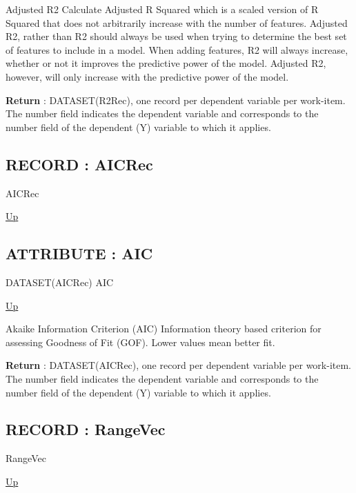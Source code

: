 \par
Adjusted R2 Calculate Adjusted R Squared which is a scaled version of R Squared that does not arbitrarily increase with the number of features. Adjusted R2, rather than R2 should always be used when trying to determine the best set of features to include in a model. When adding features, R2 will always increase, whether or not it improves the predictive power of the model. Adjusted R2, however, will only increase with the predictive power of the model.
\par
\textbf{Return} : DATASET(R2Rec), one record per dependent variable per work-item. The number field indicates the dependent variable and corresponds to the number field of the dependent (Y) variable to which it applies. \\
\subsection*{RECORD : AICRec}
\hypertarget{ecldoc:linearregression.ols.aicrec}{}
\begin{minipage}[t]{\textwidth}
\begin{flushleft}
 AICRec 
\end{flushleft}
\end{minipage}
\hyperlink{ecldoc:linearregression.ols}{Up}

\par
\par
\subsection*{ATTRIBUTE : AIC}
\hypertarget{ecldoc:linearregression.ols.aic}{}
\begin{minipage}[t]{\textwidth}
\begin{flushleft}
DATASET(AICRec) AIC 
\end{flushleft}
\end{minipage}
\hyperlink{ecldoc:linearregression.ols}{Up}

\par
Akaike Information Criterion (AIC) Information theory based criterion for assessing Goodness of Fit (GOF). Lower values mean better fit.
\par
\textbf{Return} : DATASET(AICRec), one record per dependent variable per work-item. The number field indicates the dependent variable and corresponds to the number field of the dependent (Y) variable to which it applies. \\
\subsection*{RECORD : RangeVec}
\hypertarget{ecldoc:linearregression.ols.rangevec}{}
\begin{minipage}[t]{\textwidth}
\begin{flushleft}
 RangeVec 
\end{flushleft}
\end{minipage}
\hyperlink{ecldoc:linearregression.ols}{Up}

